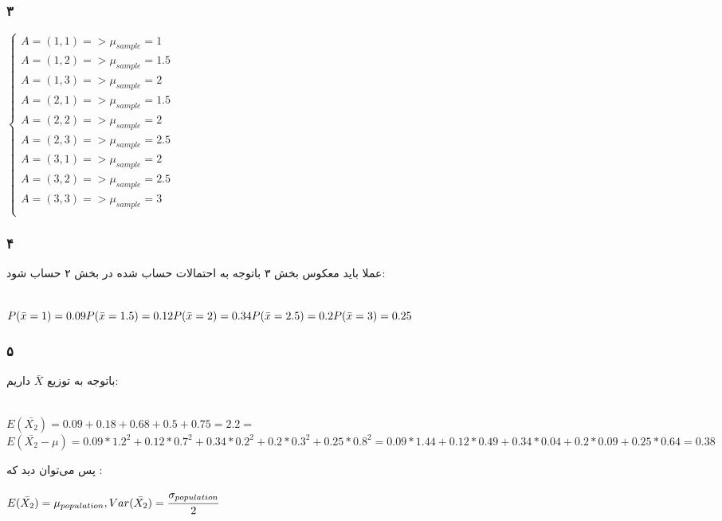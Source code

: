 \documentclass[12pt]{article}
\begin{document}
\begin{itemize}
\subsubsection{۳}
\begin{latin}
	$
	\begin{cases}
		A = (1, 1) => \mu_{sample} = 1 \\
		A = (1, 2) =>  \mu_{sample} =1.5 \\
		A = (1, 3) =>  \mu_{sample} =2 \\
		A = (2, 1) =>  \mu_{sample} =1.5 \\
		A = (2, 2) =>  \mu_{sample} =2 \\
		A = (2, 3) =>  \mu_{sample} =2.5 \\
		A = (3, 1) => \mu_{sample} =2 \\
		A = (3, 2) =>  \mu_{sample} =2.5 \\
		A = (3, 3) =>  \mu_{sample} =3 \\
	\end{cases}
	$
\end{latin}
\subsubsection{۴}
عملا باید معکوس بخش ۳ باتوجه به احتمالات حساب شده در بخش ۲ حساب شود:
\begin{latin}
	~\\
	$
	P(\bar{x}  = 1)  = 0.09 \\
P(\bar{x}  = 1.5) = 0.12 \\
P(\bar{x}  = 2) = 0.34 \\ 
P(\bar{x}  = 2.5) = 0.2 \\
P(\bar{x}  = 3) = 0.25 \\
	$
\end{latin}
\subsubsection{۵}
باتوجه به توزیع 
$\bar{X}$
داریم:
\begin{latin}
	~\\
	$
	E(\bar{X_2}) = 0.09 + 0.18 + 0.68 + 0.5 + 0.75 = 2.2 = 
	$
	\\
	$
	E(\bar{X_2} - \mu) = 0.09 * 1.2 ^2 +  0.12 * 0.7^2 + 0.34 * 0.2^2 + 0.2  * 0.3^2 + 0.25 * 0.8^2 
	= 0.09 * 1.44 + 0.12 * 0.49 + 0.34 * 0.04 + 0.2 * 0.09 + 0.25 * 0.64 = 0.38
	$
\end{latin}
پس می‌توان دید که :
\begin{latin}
	$
	E(\bar{X_2}) = \mu_{population} , Var(\bar{X_2}) = \cfrac{\sigma_{population}}{2}
	$
\end{latin}

\end{itemize}
\end{document}

